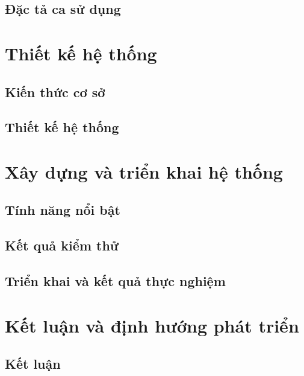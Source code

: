 \documentclass{report}
\begin{document}
\section{Đặc tả ca sử dụng}


\chapter{Thiết kế hệ thống}

\section{Kiến thức cơ sở}


\section{Thiết kế hệ thống}


% 

\chapter{Xây dựng và triển khai hệ thống}

\section{Tính năng nổi bật}


\section{Kết quả kiểm thử}


\section{Triển khai và kết quả thực nghiệm}


\chapter{Kết luận và định hướng phát triển}

\section{Kết luận}

\end{document}
